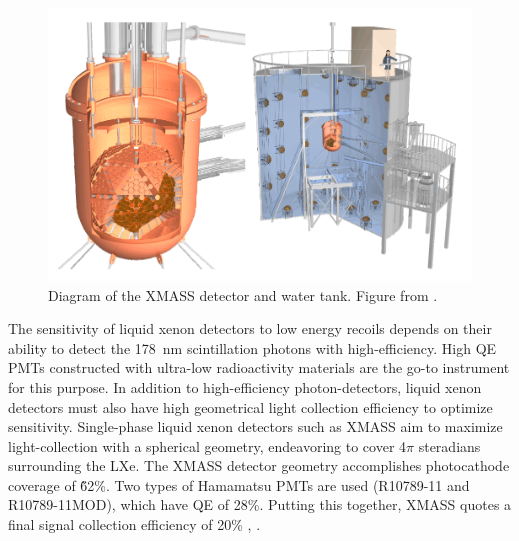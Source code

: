 \begin{figure}[htbp]
\begin{center}
\includegraphics[width=\textwidth]{figures/lxetpcs/xmass.png}
\caption{Diagram of the XMASS detector and water tank. Figure from \cite{Chepel2013}. }
\label{fig:xmass}
\end{center}
\end{figure}

The sensitivity of liquid xenon detectors to low energy recoils depends on their ability to detect the 178~nm scintillation photons with high-efficiency. High \ac{QE} \ac{PMT}s constructed with ultra-low radioactivity materials are the go-to instrument for this purpose. In addition to high-efficiency photon-detectors, liquid xenon detectors must also have high geometrical light collection efficiency to optimize sensitivity. Single-phase liquid xenon detectors such as XMASS aim to maximize light-collection with a spherical geometry, endeavoring to cover 4$\pi$ steradians surrounding the \ac{LXe}. The XMASS detector geometry accomplishes photocathode coverage of \~62\%. Two types of Hamamatsu \ac{PMT}s are used (R10789-11 and R10789-11MOD), which have \ac{QE} of 28\%. Putting this together, XMASS quotes a final signal collection efficiency of 20\% \cite{Abe2013}, \cite{XMASSCollaboration2018}. 

\FloatBarrier
